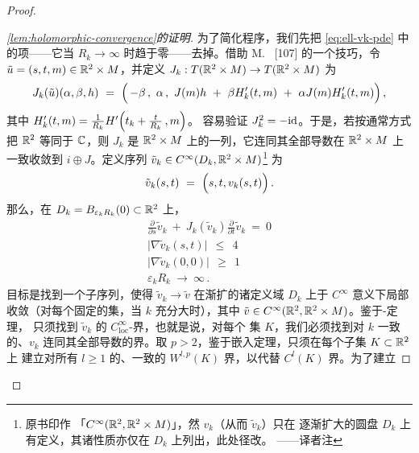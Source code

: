 \begin{proof}
\begin{proof}[\cref*{lem:holomorphic-convergence}的证明]
为了简化程序，我们先把 \eqref{eq:ell-vk-pde} 中的\trHamiltonian{}项——它当%
$R_{k}\to\infty$ 时趋于零——去掉。借助 M.~\trGromov{} [107] 的一个技巧，令%
$\tilde{u}=(s,t,m)\in\mathbb{R}^{2}\times M$，并定义%
$J_{k}:T(\mathbb{R}^{2}\times M)\to T(\mathbb{R}^{2}\times M)$ 为
\begin{equation}\label{eq:ell-jk-structure}
J_{k}(\tilde{u})(\alpha,\beta,h)\ =\ \Bigl(\,-\beta\,,\ \alpha\,,\ J(m)h\ +\ \beta H'_{k}(t,m)\ +\ \alpha J(m)H'_{k}(t,m)\Bigr)\,,
\end{equation}
其中 $H'_{k}(t,m)=\frac{1}{R_{k}}H'\Bigl(t_{k}+\frac{t}{R_{k}}\,,m\Bigr)$。%
容易验证 $J_{k}^{2}=-\mathrm{id}$。于是，若按通常方式把 $\mathbb{R}^{2}$ 等同于 $\mathbb{C}$，则 $J_{k}$%
是 $\mathbb{R}^{2}\times M$ 上的一列\trAlmostComplexStructure，它连同其全部导数在%
$\mathbb{R}^{2}\times M$ 上一致收敛到\trAlmostComplexStructure{} $i\oplus J$。定义序列%
$\tilde{v}_{k}\in C^{\infty}(D_{k},\mathbb{R}^{2}\times M)$\footnote{原书印作%
「$C^{\infty}(\mathbb{R}^{2},\mathbb{R}^{2}\times M)$」，然 $v_{k}$（从而 $\tilde{v}_{k}$）只在%
逐渐扩大的圆盘 $D_{k}$ 上有定义，其诸性质亦仅在 $D_{k}$ 上列出，此处径改。%
——译者注} 为
\begin{equation}\label{eq:ell-tilde-vk}
\tilde{v}_{k}(s,t)\ =\ \Bigl(s,t,v_{k}(s,t)\Bigr)\,.
\end{equation}
那么，在 $D_{k}=B_{\varepsilon_{k}R_{k}}(0)\subset\mathbb{R}^{2}$ 上，
\begin{equation}\label{eq:ell-tilde-vk-props}
\begin{gathered}
\frac{\partial}{\partial s}\tilde{v}_{k}\ +\ J_{k}(\tilde{v}_{k})\frac{\partial}{\partial t}\tilde{v}_{k}\ =\ 0\\
\bigl|\nabla\tilde{v}_{k}(s,t)\bigr|\ \ \leq\ \ 4\\
\bigl|\nabla\tilde{v}_{k}(0,0)\bigr|\ \ \geq\ \ 1\\
\varepsilon_{k}R_{k}\ \to\ \infty\,.
\end{gathered}
\end{equation}
目标是找到一个子序列，使得 $\tilde{v}_{k}\to\tilde{v}$ 在渐扩的诸定义域%
$D_{k}$ 上于 $C^{\infty}$ 意义下局部收敛（对每个固定的\trCompact{}集，当 $k$ 充分大时），其中%
$\tilde{v}\in C^{\infty}(\mathbb{R}^{2},\mathbb{R}^{2}\times M)$。鉴于\trArzela-\trAscoli{}定理，%
只须找到 $\tilde{v}_{k}$ 的 $C^{\infty}_{\mathrm{loc}}$-界，也就是说，对每个%
\trCompact{}集 $K$，我们必须找到对 $k$ 一致的、$v_{k}$ 连同其全部导数的界。取%
$p>2$，鉴于\trSobolev{}嵌入定理，只须在每个\trCompact{}子集 $K\subset\mathbb{R}^{2}$ 上%
建立对所有 $l\geq1$ 的、一致的 $W^{l,p}(K)$ 界，以代替 $C^{l}(K)$ 界。为了建立%

\end{proof}
\end{proof}

